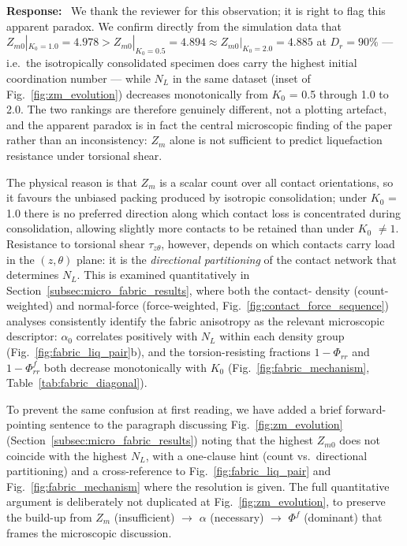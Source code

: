 \documentclass[11pt,a4paper]{article}
\newcommand{\response}{\par\noindent\textbf{Response:}\ \ignorespaces}
\newcommand{\Kzero}{\ensuremath{K_0}}
\newcommand{\Zm}{\ensuremath{Z_m}}
\begin{document}
\response
We thank the reviewer for this observation; it is right to flag this
apparent paradox. We confirm directly from the
simulation data that
$Z_{m0}|_{\Kzero=1.0}=4.978 > Z_{m0}|_{\Kzero=0.5}=4.894 \approx
Z_{m0}|_{\Kzero=2.0}=4.885$ at $D_r = 90\%$ — i.e.\ the
isotropically consolidated specimen does carry the highest initial
coordination number — while $N_L$ in the same dataset (inset of
Fig.~\ref{fig:zm_evolution}) decreases monotonically from
\Kzero{} = 0.5 through 1.0 to 2.0. The two rankings are therefore genuinely
different, not a plotting artefact, and the apparent paradox is in
fact the central microscopic finding of the paper rather than an
inconsistency: \Zm{} alone is not sufficient to predict liquefaction
resistance under torsional shear.

The physical reason is that \Zm{} is a scalar count over all contact
orientations, so it favours the unbiased packing produced by
isotropic consolidation; under \Kzero{} = 1.0 there is no preferred
direction along which contact loss is concentrated during
consolidation, allowing slightly more contacts to be retained than
under \Kzero{} $\neq 1$. Resistance to torsional shear $\tau_{z\theta}$,
however, depends on which contacts carry load in the $(z,\theta)$
plane: it is the \emph{directional partitioning} of the contact
network that determines $N_L$. This is examined quantitatively in
Section~\ref{subsec:micro_fabric_results}, where both the contact-
density (count-weighted) and normal-force (force-weighted,
Fig.~\ref{fig:contact_force_sequence}) analyses consistently identify
the fabric anisotropy as the relevant microscopic descriptor: $\alpha_0$ correlates positively with $N_L$
within each density group (Fig.~\ref{fig:fabric_liq_pair}b), and the
torsion-resisting fractions $1-\Phi_{rr}$ and $1-\Phi^f_{rr}$ both
decrease monotonically with \Kzero{}
(Fig.~\ref{fig:fabric_mechanism}, Table~\ref{tab:fabric_diagonal}).

To prevent the same confusion at first reading, we have added a brief
forward-pointing sentence to the paragraph discussing
Fig.~\ref{fig:zm_evolution}
(Section~\ref{subsec:micro_fabric_results}) noting that the highest
$Z_{m0}$ does not coincide with the highest $N_L$, with a one-clause
hint (count vs.\ directional partitioning) and a cross-reference to
Fig.~\ref{fig:fabric_liq_pair} and Fig.~\ref{fig:fabric_mechanism}
where the resolution is given. The full quantitative argument is
deliberately not duplicated at Fig.~\ref{fig:zm_evolution}, to
preserve the build-up from \Zm{} (insufficient) $\to$ $\alpha$
(necessary) $\to$ $\Phi^f$ (dominant) that frames the microscopic
discussion.
\end{document}
